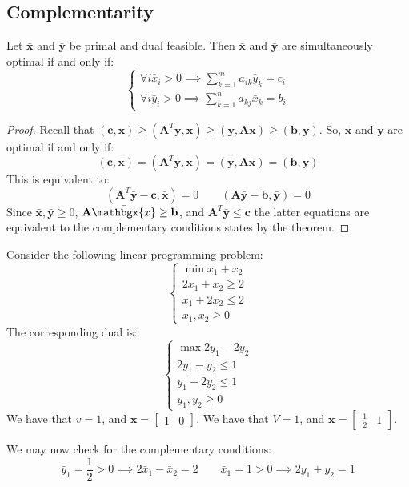 \subsection{Complementarity}
\begin{theorem}
    Let $\bar{\mathbf{x}}$ and $\bar{\mathbf{y}}$ be primal and dual feasible. 
    Then $\bar{\mathbf{x}}$ and $\bar{\mathbf{y}}$ are simultaneously optimal if and only if: 
    \[\begin{cases}
        \forall i \bar{x}_i>0 \implies\sum_{k=1}^ma_{ik}\bar{y}_k=c_i \\
        \forall i \bar{y}_i>0 \implies\sum_{k=1}^na_{kj}\bar{x}_k=b_i 
    \end{cases}\]
\end{theorem}
\begin{proof}
    Recall that $(\mathbf{c},\mathbf{x})\geq(\mathbf{A}^T\mathbf{y},\mathbf{x})\geq(\mathbf{y},\mathbf{Ax})\geq(\mathbf{b},\mathbf{y})$.
    So, $\bar{\mathbf{x}}$ and $\bar{\mathbf{y}}$ are optimal if and only if: 
    \[(\mathbf{c},\bar{\mathbf{x}})=(\mathbf{A}^T\bar{\mathbf{y}},\bar{\mathbf{x}})=(\bar{\mathbf{y}},\mathbf{A}\bar{\mathbf{x}})=(\mathbf{b},\bar{\mathbf{y}})\]
    This is equivalent to: 
    \[(\mathbf{A}^T\bar{\mathbf{y}}-\mathbf{c},\bar{\mathbf{x}})=0 \qquad (\mathbf{A}\bar{\mathbf{y}}-\mathbf{b},\bar{\mathbf{y}})=0 \]
    Since $\bar{\mathbf{x}}, \bar{\mathbf{y}}\geq 0$, $\mathbf{A}\bar{\mathbgx{x}}\geq \mathbf{b}$, and $\mathbf{A}^T\bar{\mathbf{y}}\leq\mathbf{c}$ the latter equations are equivalent to the complementary conditions states by the theorem.
\end{proof}
\begin{example}
    Consider the following linear programming problem: 
    \[\begin{cases}
        \min x_1+x_2 \\
        2x_1+x_2 \geq 2 \\ 
        x_1 + 2x_2 \leq 2 \\
        x_1,x_2 \geq 0
    \end{cases}\]
    The corresponding dual is: 
    \[\begin{cases}
        \max 2y_1-2y_2 \\
        2y_1 - y_2 \leq 1 \\
        y_1-2y_2 \leq 1 \\
        y_1,y_2 \geq 0
    \end{cases}\]
    We have that $v=1$, and $\bar{\mathbf{x}}=\begin{bmatrix} 1 & 0 \end{bmatrix}$. 
    We have that $V=1$, and $\bar{\mathbf{x}}=\begin{bmatrix} \frac{1}{2} & 1 \end{bmatrix}$.

    We may now check for the complementary conditions: 
    \[\bar{y}_1=\dfrac{1}{2}>0\implies2\bar{x}_1-\bar{x}_2=2 \qquad \bar{x}_1=1>0 \implies 2y_1+y_2=1\]
\end{example}

